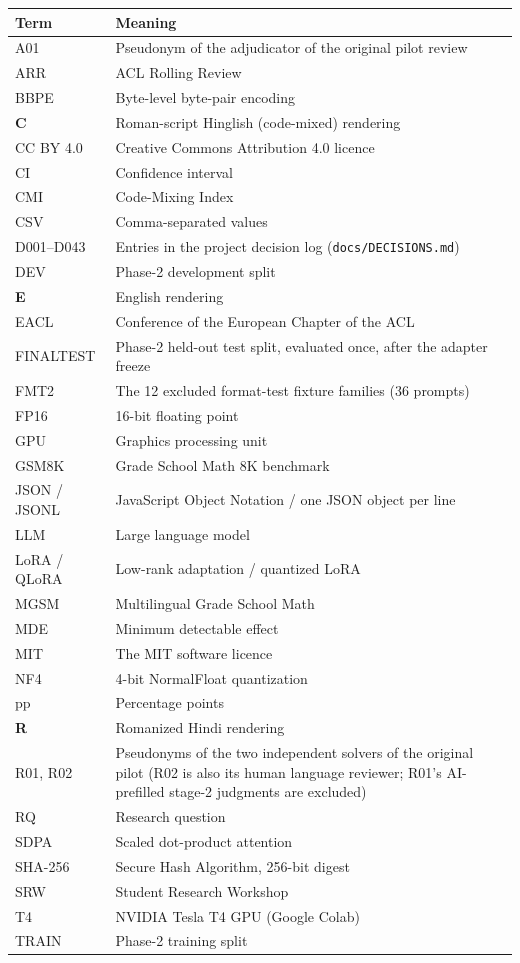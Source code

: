 \documentclass[12pt,a4paper,oneside]{report}
\renewcommand{\_}{\oldunderscore\allowbreak}
\newcommand{\form}[1]{\textbf{#1}}
\begin{document}
\begin{longtable}{@{}p{3.2cm}p{10.5cm}@{}}
\toprule
\textbf{Term} & \textbf{Meaning}\\
\midrule
\endhead
A01 & Pseudonym of the adjudicator of the original pilot review\\
ARR & ACL Rolling Review\\
BBPE & Byte-level byte-pair encoding\\
\form{C} & Roman-script Hinglish (code-mixed) rendering\\
CC BY 4.0 & Creative Commons Attribution 4.0 licence\\
CI & Confidence interval\\
CMI & Code-Mixing Index\\
CSV & Comma-separated values\\
D001--D043 & Entries in the project decision log (\texttt{docs/DECISIONS.md})\\
DEV & Phase-2 development split\\
\form{E} & English rendering\\
EACL & Conference of the European Chapter of the ACL\\
FINAL\_TEST & Phase-2 held-out test split, evaluated once, after the adapter freeze\\
FMT2 & The 12 excluded format-test fixture families (36 prompts)\\
FP16 & 16-bit floating point\\
GPU & Graphics processing unit\\
GSM8K & Grade School Math 8K benchmark\\
JSON / JSONL & JavaScript Object Notation / one JSON object per line\\
LLM & Large language model\\
LoRA / QLoRA & Low-rank adaptation / quantized LoRA\\
MGSM & Multilingual Grade School Math\\
MDE & Minimum detectable effect\\
MIT & The MIT software licence\\
NF4 & 4-bit NormalFloat quantization\\
pp & Percentage points\\
\form{R} & Romanized Hindi rendering\\
R01, R02 & Pseudonyms of the two independent solvers of the original pilot (R02 is also its human language reviewer; R01's AI-prefilled stage-2 judgments are excluded)\\
RQ & Research question\\
SDPA & Scaled dot-product attention\\
SHA-256 & Secure Hash Algorithm, 256-bit digest\\
SRW & Student Research Workshop\\
T4 & NVIDIA Tesla T4 GPU (Google Colab)\\
TRAIN & Phase-2 training split\\
\bottomrule
\end{longtable}
\end{document}
